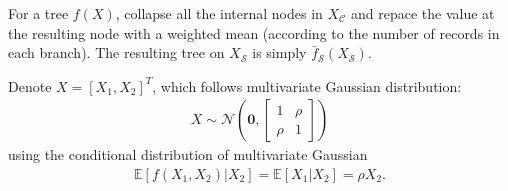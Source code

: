 \begin{exercise}
  For a tree $f(X)$, collapse all the internal nodes in $X_{\mathcal{C}}$ and
  repace the value at the resulting node with a weighted mean (according to the
  number of records in each branch). The resulting tree on $X_{\mathcal{S}}$ is
  simply $\bar{f}_{\mathcal{S}}(X_{\mathcal{S}})$.
\end{exercise}

\begin{exercise}
  Denote $X = [X_1, X_2]^T$, which follows multivariate Gaussian distribution:
  \begin{align}
    X\sim\mathcal{N}\left(\mathbf{0}, \left[
      \begin{array}{cc}
        1 & \rho \\
        \rho & 1
      \end{array}
    \right]\right)
  \end{align}
  using the conditional distribution of multivariate Gaussian
  \begin{align}
    \mathbb{E}[f(X_1, X_2)|X_2] = \mathbb{E}[X_1|X_2] = \rho X_2.
  \end{align}
\end{exercise}